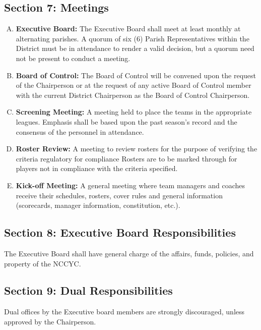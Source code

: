 \documentclass[letteraper,10pt,oneside,draft]{memoir}
\begin{document}
\subsection{Section 7: Meetings}
\label{ssec:const-4-7}
\begin{enumerate}[A.]
    \item \textbf{Executive Board:}  The Executive Board shall meet at least monthly at alternating parishes.  A quorum of six (6)
    Parish Representatives within the District must be in attendance to render a valid decision, but a quorum need 
    not be present to conduct a meeting.
    \item \textbf{Board of Control:}  The Board of Control will be convened upon the request of the Chairperson or at the request 
    of any active Board of Control member with the current District Chairperson as the Board of Control Chairperson.
    \item \textbf{Screening Meeting:}  A meeting held to place the teams in the appropriate leagues.  Emphasis shall be based upon 
    the past season’s record and the consensus of the personnel in attendance.
    \item \textbf{Roster Review:}  A meeting to review rosters for the purpose of verifying the criteria regulatory for compliance
	Rosters are to be marked through for players not in compliance with the criteria specified.
    \item \textbf{Kick-off Meeting:}  A general meeting where team managers and coaches receive their schedules, rosters, cover
    rules and general information (scorecards, manager information, constitution, etc.).
\end{enumerate}

\subsection{Section 8: Executive Board Responsibilities}
\label{ssec:const-4-8}
The Executive Board shall have general charge of the affairs, funds, policies, and property of the NCCYC.

\subsection{Section 9: Dual Responsibilities}
\label{ssec:const-4-9}
Dual offices by the Executive board members are strongly discouraged, unless approved by the Chairperson.
\end{document}
